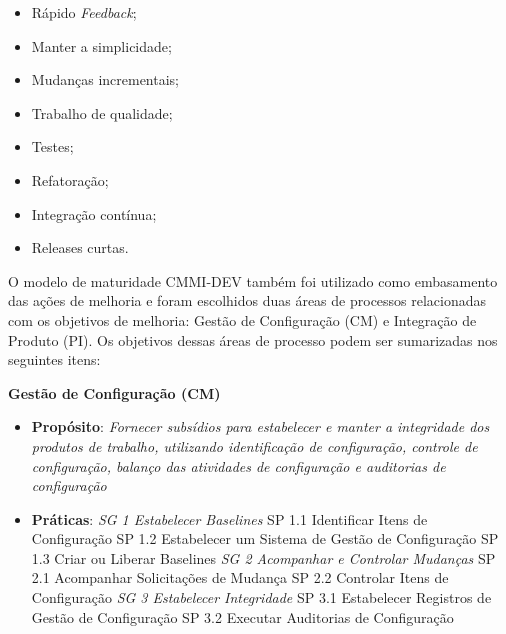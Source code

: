 \begin{itemize}
 \item Rápido \textit{Feedback};
 \item Manter a simplicidade;
 \item Mudanças incrementais;
 \item Trabalho de qualidade;
 \item Testes;
 \item Refatoração;
 \item Integração contínua;
 \item Releases curtas.
\end{itemize}

O modelo de maturidade CMMI-DEV também foi utilizado como embasamento das ações de melhoria e foram escolhidos duas áreas de
processos relacionadas com os objetivos de melhoria: Gestão de Configuração (CM) e Integração de Produto (PI).
Os objetivos dessas áreas de processo podem ser sumarizadas nos seguintes itens:


\noindent
\textbf{Gestão de Configuração (CM)}
\begin{itemize}
    \item \textbf{Propósito}: \emph{Fornecer subsídios para estabelecer e manter a integridade dos produtos de
      trabalho, utilizando identificação de configuração, controle de configuração, balanço das atividades de configuração e auditorias de
      configuração \cite{cmmi}}
    \item \textbf{Práticas}:
        \subitem \textit{SG 1 Estabelecer Baselines}
	  \subsubitem SP 1.1 Identificar Itens de Configuração 
	  \subsubitem SP 1.2 Estabelecer um Sistema de Gestão de Configuração 
	  \subsubitem SP 1.3 Criar ou Liberar Baselines 
	\subitem \textit{SG 2 Acompanhar e Controlar Mudanças}
	  \subsubitem SP 2.1 Acompanhar Solicitações de Mudança 
	  \subsubitem SP 2.2 Controlar Itens de Configuração 
	 \subitem \textit{SG 3 Estabelecer Integridade }
	  \subsubitem SP 3.1 Estabelecer Registros de Gestão de Configuração
	  \subsubitem SP 3.2 Executar Auditorias de Configuração
\end{itemize}
		

